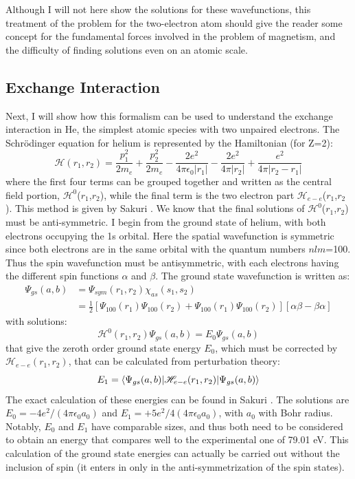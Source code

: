 Although I will not here show the solutions for these wavefunctions, this treatment of the problem for the two-electron atom should give the reader some concept for the fundamental forces involved in the problem of magnetism, and the difficulty of finding solutions even on an atomic scale.

\subsection{Exchange Interaction}
\label{exchange}
Next, I will show how this formalism can be used to understand the exchange interaction in He, the simplest atomic species with two unpaired electrons. The Schr\"odinger equation for helium is represented by the Hamiltonian (for Z=2):
\begin{equation}
\mathscr{H}(r_1,r_2)=\frac{p^2_1}{2m_e}+\frac{p_2^2}{2m_e}-\frac{2e^2}{4\pi \epsilon_0|r_1|}-\frac{2e^2}{4\pi|r_2|}+\frac{e^2}{4\pi|r_2-r_1|}
\end{equation}
where the first four terms can be grouped together and written as the central field portion, $\mathscr{H}^0$($r_1$,$r_2$), while the final term is the two electron part $\mathscr{H}_{e-e}$($r_1$,$r_2$). This method is given by Sakuri \cite{Sakuri1994}. We know that the final solutions of $\mathscr{H}^0$($r_1$,$r_2$) must be anti-symmetric. I begin from the ground state of helium, with both electrons occupying the 1s orbital. Here the spatial wavefunction is symmetric since both electrons are in the same orbital with the quantum numbers $nlm$=100. Thus the spin wavefunction must be antisymmetric, with each electrons having the different spin functions $\alpha$ and $\beta$. The ground state wavefunction is written as:
\begin{align}
\Psi_{gs}(a,b) &= \Psi_{sym}(r_1,r_2)\chi_{as}(s_1,s_2) \\
	&=\frac{1}{2}[\Psi_{100}(r_1)\Psi_{100}(r_2)+\Psi_{100}(r_1)\Psi_{100}(r_2)][\alpha\beta-\beta\alpha]
\end{align}	
with solutions:
\begin{equation}
\mathscr{H}^0(r_1,r_2)\Psi_{gs}(a,b)=E_0\Psi_{gs}(a,b)
\end{equation}
that give the zeroth order ground state energy $E_0$, which must be corrected by $\mathscr{H}_{e-e}(r_1,r_2)$, that can be calculated from perturbation theory:
\begin{equation}
E_1=\braket{\Psi_{gs}(a,b)|\mathscr{H}_{e-e}(r_1,r_2)|\Psi_{gs}(a,b)}
\end{equation}
The exact calculation of these energies can be found in Sakuri \cite{Sakuri1994}. The solutions are $E_0=-4e^2/(4\pi\epsilon_0 a_0)$ and $E_1=+5e^2/4(4\pi\epsilon_0a_0)$, with $a_0$ with Bohr radius. Notably, $E_0$ and $E_1$ have comparable sizes, and thus both need to be considered to obtain an energy that compares well to the experimental one of 79.01 eV. This calculation of the ground state energies can actually be carried out without the inclusion of spin (it enters in only in the anti-symmetrization of the spin states).

